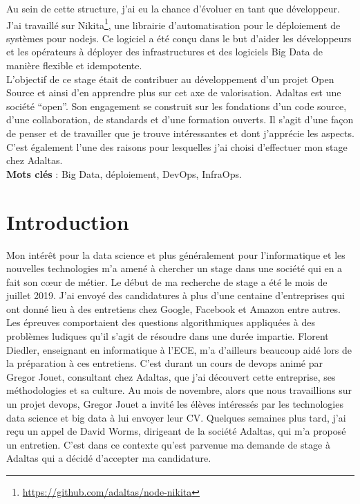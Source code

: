 \documentclass[12pt, french]{report}
\begin{document}
Au sein de cette structure, j'ai eu la chance d'évoluer en tant que développeur. J'ai travaillé sur Nikita\footnote{\href{https://github.com/adaltas/node-nikita}{https://github.com/adaltas/node-nikita}}, une librairie d’automatisation pour le déploiement de systèmes pour \gls{nodejs}. Ce logiciel a été conçu dans le but d'aider les développeurs et les opérateurs à déployer des infrastructures et des logiciels Big Data de manière flexible et idempotente.\\

L'objectif de ce stage était de contribuer au développement d'un projet Open Source et ainsi d'en apprendre plus sur cet axe de valorisation. Adaltas est une société “open”. Son engagement se construit sur les fondations d’un code source, d’une collaboration, de standards et d’une formation ouverts. Il s'agit d'une façon de penser et de travailler que je trouve intéressantes et dont j'apprécie les aspects. C'est également l'une des raisons pour lesquelles j'ai choisi d'effectuer mon stage chez Adaltas.\\

\noindent\textbf{Mots clés} : Big Data, déploiement, DevOps, InfraOps.

\newpage
\thispagestyle{empty}
\mbox{}
\newpage

\begingroup
\hypersetup{linkcolor=black}
\listoffigures
\tableofcontents
\newpage
\endgroup

\chapter*{Introduction}

Mon intérêt pour la data science et plus généralement pour l’informatique et les nouvelles technologies m’a amené à chercher un stage dans une société qui en a fait son cœur de métier. Le début de ma recherche de stage a été le mois de juillet 2019. J'ai envoyé des candidatures à plus d'une centaine d'entreprises qui ont donné lieu à des entretiens chez Google, Facebook et Amazon entre autres. Les épreuves comportaient des questions algorithmiques appliquées à des problèmes ludiques qu'il s'agit de résoudre dans une durée impartie. Florent Diedler, enseignant en informatique à l'ECE, m'a d'ailleurs beaucoup aidé lors de la préparation à ces entretiens. C'est durant un cours de \gls{devops} animé par Gregor Jouet, consultant chez Adaltas, que j'ai découvert cette entreprise, ses méthodologies et sa culture. Au mois de novembre, alors que nous travaillions sur un projet \gls{devops}, Gregor Jouet a invité les élèves intéressés par les technologies data science et big data à lui envoyer leur CV. Quelques semaines plus tard, j'ai reçu un appel de David Worms, dirigeant de la société Adaltas, qui m'a proposé un entretien. C'est dans ce contexte qu'est parvenue ma demande de stage à Adaltas qui a décidé d'accepter ma candidature.\\
\end{document}
